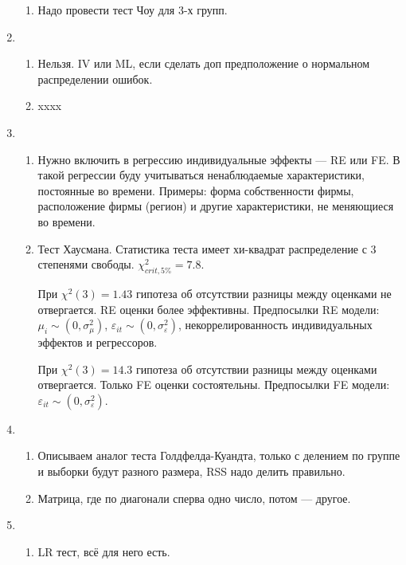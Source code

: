 \begin{enumerate}
\begin{enumerate}
            \item Надо провести тест Чоу для 3-х групп.
    \end{enumerate}

\item \begin{enumerate}
\item  Нельзя. IV или ML, если сделать доп предположение о нормальном распределении ошибок.
\item xxxx
\end{enumerate}
    
\item \begin{enumerate}
    \item Нужно включить в регрессию индивидуальные эффекты — RE или FE. 
    В такой регрессии буду учитываться ненаблюдаемые характеристики, постоянные во времени. 
    Примеры: форма собственности фирмы, расположение фирмы (регион) и другие характеристики, не меняющиеся во времени.

\item  Тест Хаусмана.  
Статистика теста имеет хи-квадрат распределение с 3 степенями свободы.
$\chi^2_{crit, 5\%}=7.8$. 

При $\chi^2 (3)=1.43$  гипотеза об отсутствии разницы между оценками не отвергается. RE оценки более эффективны.
Предпосылки RE модели: $\mu_i \sim (0,\sigma^2_{\mu})$, $\varepsilon_{it} \sim (0, \sigma^2_{\varepsilon})$, некоррелированность  индивидуальных эффектов и регрессоров.

При $\chi^2 (3)=14.3$  гипотеза об отсутствии разницы между оценками отвергается. Только FE оценки состоятельны.
Предпосылки FE модели: $\varepsilon_{it} \sim (0, \sigma^2_{\varepsilon})$.
\end{enumerate}

\item \begin{enumerate}
    \item Описываем аналог теста Голдфелда-Куандта, только с делением по группе и выборки будут разного размера, 
    RSS надо делить правильно.
    
    \item Матрица, где по диагонали сперва одно число, потом — другое.
    
\end{enumerate}

\item \begin{enumerate}
    \item LR тест, всё для него есть.
    

\end{enumerate}
\end{enumerate}
